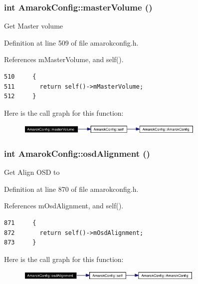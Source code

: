 \subsubsection{\setlength{\rightskip}{0pt plus 5cm}int Amarok\-Config::master\-Volume ()\hspace{0.3cm}{\tt  [inline, static]}}\label{classAmarokConfig_AmarokConfige52}


Get Master volume 

Definition at line 509 of file amarokconfig.h.

References m\-Master\-Volume, and self().



\footnotesize\begin{verbatim}510     {
511       return self()->mMasterVolume;
512     }
\end{verbatim}\normalsize 


Here is the call graph for this function:\begin{figure}[H]
\begin{center}
\leavevmode
\includegraphics[width=256pt]{classAmarokConfig_AmarokConfige52_cgraph}
\end{center}
\end{figure}
\subsubsection{\setlength{\rightskip}{0pt plus 5cm}int Amarok\-Config::osd\-Alignment ()\hspace{0.3cm}{\tt  [inline, static]}}\label{classAmarokConfig_AmarokConfige90}


Get Align OSD to 

Definition at line 870 of file amarokconfig.h.

References m\-Osd\-Alignment, and self().



\footnotesize\begin{verbatim}871     {
872       return self()->mOsdAlignment;
873     }
\end{verbatim}\normalsize 


Here is the call graph for this function:\begin{figure}[H]
\begin{center}
\leavevmode
\includegraphics[width=254pt]{classAmarokConfig_AmarokConfige90_cgraph}
\end{center}
\end{figure}
